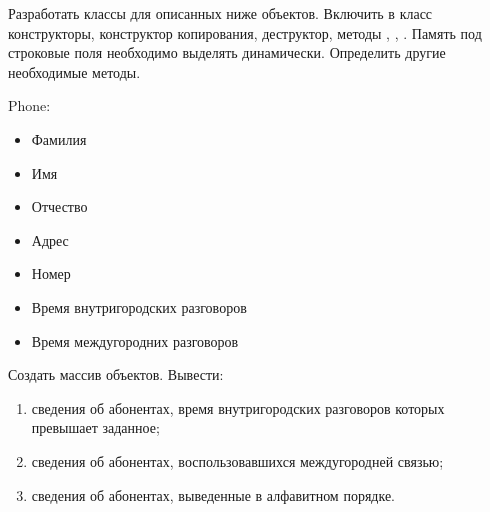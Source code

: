 
Разработать классы для описанных ниже объектов. Включить в класс
конструкторы, конструктор копирования, деструктор, методы ,
, . Память под строковые поля необходимо выделять
динамически. Определить другие необходимые методы.

Phone:
\begin{itemize}
	\item Фамилия
	\item Имя
	\item Отчество
	\item Адрес
	\item Номер
	\item Время внутригородских разговоров
	\item Время междугородних разговоров
\end{itemize}

Создать массив объектов. Вывести:
\begin{enumerate}
	\item сведения об абонентах, время внутригородских разговоров которых превышает заданное;
	\item сведения об абонентах, воспользовавшихся междугородней связью;
	\item сведения об абонентах, выведенные в алфавитном порядке.
\end{enumerate}
